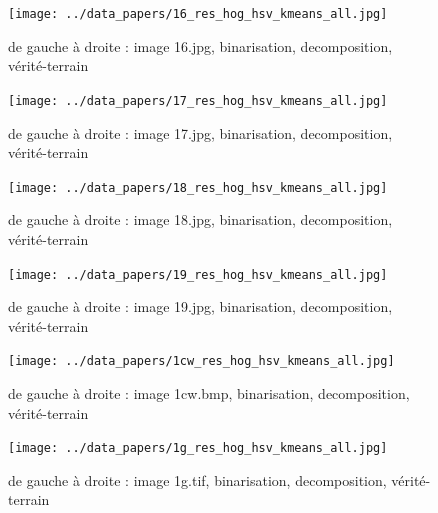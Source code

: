 \documentclass{book}
\begin{document}
\begin{figure}[H]
\begin{center}
\texttt{[image: ../data\_papers/16\_res\_hog\_hsv\_kmeans\_all.jpg]}
\end{center}
\caption{de gauche à droite : image 16.jpg, binarisation, decomposition, vérité-terrain}
\label{16}
\end{figure}
\clearpage


\begin{figure}[H]
\begin{center}
\texttt{[image: ../data\_papers/17\_res\_hog\_hsv\_kmeans\_all.jpg]}
\end{center}
\caption{de gauche à droite : image 17.jpg, binarisation, decomposition, vérité-terrain}
\label{17}
\end{figure}
\clearpage


\begin{figure}[H]
\begin{center}
\texttt{[image: ../data\_papers/18\_res\_hog\_hsv\_kmeans\_all.jpg]}
\end{center}
\caption{de gauche à droite : image 18.jpg, binarisation, decomposition, vérité-terrain}
\label{18}
\end{figure}
\clearpage


\begin{figure}[H]
\begin{center}
\texttt{[image: ../data\_papers/19\_res\_hog\_hsv\_kmeans\_all.jpg]}
\end{center}
\caption{de gauche à droite : image 19.jpg, binarisation, decomposition, vérité-terrain}
\label{19}
\end{figure}
\clearpage


\begin{figure}[H]
\begin{center}
\texttt{[image: ../data\_papers/1cw\_res\_hog\_hsv\_kmeans\_all.jpg]}
\end{center}
\caption{de gauche à droite : image 1cw.bmp, binarisation, decomposition, vérité-terrain}
\label{1cw}
\end{figure}
\clearpage


\begin{figure}[H]
\begin{center}
\texttt{[image: ../data\_papers/1g\_res\_hog\_hsv\_kmeans\_all.jpg]}
\end{center}
\caption{de gauche à droite : image 1g.tif, binarisation, decomposition, vérité-terrain}
\label{1g}
\end{figure}
\clearpage
\end{document}
